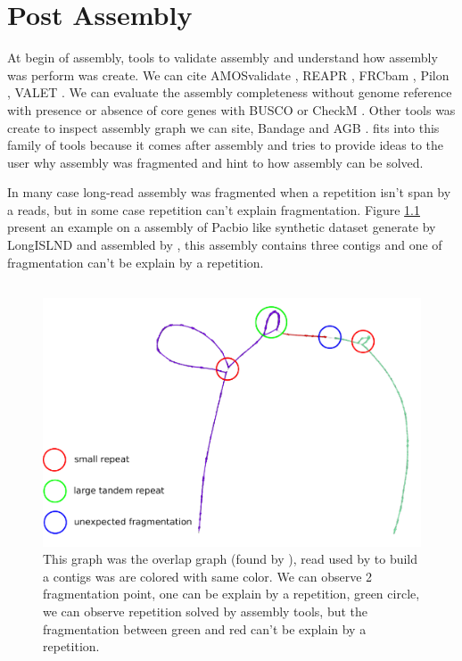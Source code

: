 \documentclass[main.tex]{subfiles}
\begin{document}
\chapter{Post Assembly} 

At begin of assembly, tools to validate assembly and understand how assembly was perform was create. We can cite AMOSvalidate \cite{amosvalidate}, REAPR \cite{REAPR}, FRCbam \cite{FRCbam}, Pilon \cite{Pilon}, VALET \cite{VALET}. We can evaluate the assembly completeness without genome reference with presence or absence of core genes with BUSCO \cite{busco} or CheckM \cite{checkm}. Other tools was create to inspect assembly graph we can site, Bandage\cite{bandage} and AGB \cite{AGB}. \knot fits into this family of tools because it comes after assembly and tries to provide ideas to the user why assembly was fragmented and hint to how assembly can be solved.

In many case long-read assembly was fragmented when a repetition isn't span by a reads, but in some case repetition can't explain fragmentation. Figure \ref{postassembly:fig:t_roseus_example} present an example on a assembly of Pacbio like synthetic dataset generate by LongISLND\cite{longislnd} and assembled by \canu, this assembly contains three contigs and one of fragmentation can't be explain by a repetition.

\section{\knot} \label{section:postassembly:knot}

\begin{figure}[ht]
    \includegraphics[width=\textwidth]{postassembly/images/t_roseus_projection_annoted.pdf}
    \caption{This graph was the overlap graph (found by \minimap), read used by \canu to build a contigs was are colored with same color. We can observe 2 fragmentation point, one can be explain by a repetition, green circle, we can observe repetition solved by assembly tools, but the fragmentation between green and red can't be explain by a repetition.}
    \label{postassembly:fig:t_roseus_example}
\end{figure}




%



\end{document}
